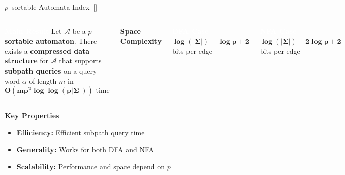 \documentclass[aspectratio=169]{beamer}
\begin{document}
\begin{frame}{$p$--sortable Automata Index~[\cite{cotumaccio2021indexing}]}
	\begin{columns}[c]
		\begin{block}{\textcolor{white}{\textbf{Main Result}}}
			Let $\mathcal{A}$ be a \textcolor{oiBlue}{\textbf{$p$--sortable automaton}}. There exists a \textcolor{oiGreen}{\textbf{compressed data structure}} for $\mathcal{A}$ that supports \textcolor{oiPurple}{\textbf{subpath queries}} on a query word $\alpha$ of length $m$ in
			\[\mathbf{O(mp^2\log\log(p|\Sigma|))}\text{ time}\]
		\end{block}

		\textcolor{oiGreen}{\textbf{Space Complexity}}
		\begin{block}{\textcolor{white}{\textbf{DFA Case}}}
			$\mathbf{\log(|\Sigma|) + \log p + 2}$ bits per edge
		\end{block}

		\vspace{0.2cm}
		\begin{block}{\textcolor{white}{\textbf{NFA Case}}}
			$\mathbf{\log(|\Sigma|) + 2\log p + 2}$ bits per edge
		\end{block}
	\end{columns}
	\vspace{0.3cm}
	\textcolor{oiRed}{\textbf{Key Properties}}
	\begin{itemize}
		\item \textbf{Efficiency:} Efficient subpath query time
		\item \textbf{Generality:} Works for both DFA and NFA
		\item \textbf{Scalability:} Performance and space depend on $p$
	\end{itemize}
\end{frame}

\end{document}
